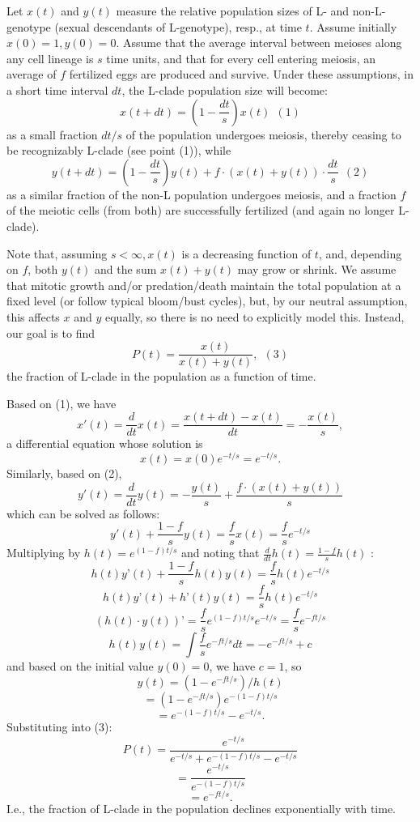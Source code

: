 \documentclass{article}\usepackage[]{graphicx}\usepackage[]{color}
\begin{document}
Let $x(t)$ and $y(t)$ measure the relative population sizes of L- and non-L-genotype (sexual
descendants of L-genotype), resp., at time $t$.  Assume initially $x(0) = 1, y(0) = 0$.  Assume that
the average interval between meioses along any cell lineage is $s$ time units, and that for every
cell entering meiosis, an average of $f$ fertilized eggs are produced and survive.  Under these
assumptions, in a short time interval $dt$, the L-clade population size will become:
  $$x(t+dt) = \left(1-\frac{dt}{s}\right) x(t)  \ \ (1)$$                                   
as a small fraction $dt/s$ of the population undergoes meiosis, thereby ceasing to be recognizably
L-clade (see point (1)), while
  $$y(t+dt) = \left(1-\frac{dt}{s}\right) y(t) + f \cdot (x(t) + y(t)) \cdot\frac{dt}{s} \ \  (2)$$
as a similar fraction of the non-L population undergoes meiosis, and a fraction $f$ of the meiotic
cells (from both) are successfully fertilized (and again no longer L-clade).

Note that, assuming $s < \infty, x(t)$ is a decreasing function of $t$, and, depending on $f$, both
$y(t)$ and the sum $x(t)+y(t)$ may grow or shrink.  We assume that mitotic growth and/or
predation/death maintain the total population at a fixed level (or follow typical bloom/bust
cycles), but, by our neutral assumption, this affects $x$ and $y$ equally, so there is no need to
explicitly model this.  Instead, our goal is to find
  $$P(t) = \frac{x(t)}{x(t)+y(t)}, \ \                            (3)$$
the fraction of L-clade in the population as a function of time.  

Based on (1), we have 
  $$x'(t) = \frac{d}{dt}x(t) = \frac{x(t+dt)-x(t)}{dt} = -\frac{x(t)}{s} ,$$
a differential equation whose solution is 
  $$x(t) = x(0) e^{-t/s} = e^{-t/s}.$$ 
Similarly, based on (2),
  $$y'(t) = \frac{d}{dt}y(t) = -\frac{y(t)}{s} + \frac{f \cdot (x(t)+y(t))}{s}$$
which can be solved %
as follows:
  $$y'(t) + \frac{1-f}{s}y(t) = \frac{f}{s}x(t) = \frac{f}{s} e^{-t/s}$$
Multiplying by $h(t) = e^{(1-f)t/s}$ and noting that $\frac{d}{dt}h(t) = \frac{1-f}{s}h(t)$ :
%
  $$h(t) y’(t) + \frac{1-f}{s} h(t) y(t) = \frac{f}{s} h(t) e^{-t/s}$$
%
  $$h(t) y’(t) + h’(t) y(t)          = \frac{f}{s} h(t) e^{-t/s}$$
%
  $$(h(t) \cdot y(t))’ = \frac{f}{s} e^{(1-f)t/s} e^{-t/s} = \frac{f}{s}   e^{-ft/s}$$
%
  $$h(t) y(t) = \int \frac{f}{s}  e^{-ft/s} dt  = - e^{-ft/s} + c$$
%
and based on the initial value $y(0)=0$, we have $c=1$, so
%
  $$y(t) = (1 - e^{-ft/s}) / h(t)$$
%
  $$     = (1 - e^{-ft/s})  e^{-(1-f)t/s}$$
%
  $$     = e^{-(1-f)t/s} - e^{-t/s} .$$
%
Substituting into (3):
%
  $$P(t) = \frac{e^{-t/s}}{e^{-t/s} + e^{-(1-f)t/s} - e^{-t/s}}$$
%
  $$     = \frac{e^{-t/s}}{e^{-(1-f)t/s}}$$
%
  $$     = e^{-ft/s} .$$
%
I.e., the fraction of L-clade in the population declines exponentially with time.  
\end{document}
